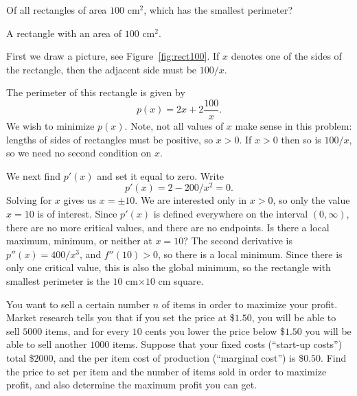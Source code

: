 \begin{example}
Of all rectangles of area $100$ cm$^2$, which has the smallest
perimeter?
\end{example}

\begin{marginfigure}
\caption{A rectangle with an area of $100$ cm$^2$.}
\label{fig:rect100}
\end{marginfigure}

\begin{solution}
First we draw a picture, see Figure~\ref{fig:rect100}.  If $x$ denotes
one of the sides of the rectangle, then the adjacent side must be
$100/x$.


The perimeter of this rectangle is given by
\[
p(x)=2x+2\frac{100}{x}.
\]
We wish to minimize $p(x)$.  Note, not all values of $x$ make sense in
this problem: lengths of sides of rectangles must be positive, so
$x>0$. If $x>0$ then so is $100/x$, so we need no second condition on
$x$.

We next find $p'(x)$ and set it equal to zero. Write
\[
p'(x)=2-200/x^2 = 0.
\]
Solving for $x$ gives us $x=\pm 10$. We are interested only in $x>0$,
so only the value $x=10$ is of interest. Since $p'(x)$ is defined
everywhere on the interval $(0,\infty)$, there are no more critical
values, and there are no endpoints. Is there a local maximum, minimum,
or neither at $x=10$? The second derivative is $p''(x)=400/x^3$, and
$f''(10)>0$, so there is a local minimum. Since there is only one
critical value, this is also the global minimum, so the rectangle with
smallest perimeter is the $10$ cm$\times10$ cm square.
\end{solution}

\begin{example}
You want to sell a certain number $n$ of items in order to maximize your
profit.  Market research tells you that if you set the price at \$$1.50$, you
will be able to sell $5000$ items, and for every $10$ cents you lower the price
below \$$1.50$ you will be able to sell another $1000$ items.  Suppose that
your fixed costs (``start-up costs'') total \$$2000$, and the per item cost
of production (``marginal cost'') is \$$0.50$.  Find the price to set per
item and the number of items sold in order to maximize profit, and also
determine the maximum profit you can get.
\end{example}

